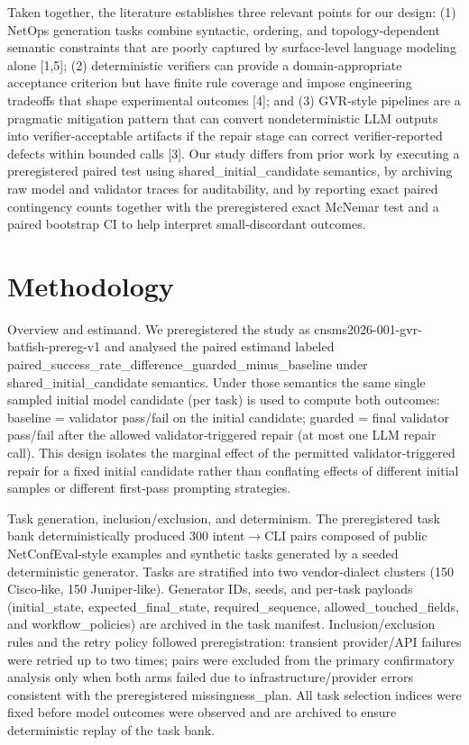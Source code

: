 \documentclass[conference]{IEEEtran}
\begin{document}
Taken together, the literature establishes three relevant points for our design: (1) NetOps generation tasks combine syntactic, ordering, and topology‑dependent semantic constraints that are poorly captured by surface‑level language modeling alone [1,5]; (2) deterministic verifiers can provide a domain‑appropriate acceptance criterion but have finite rule coverage and impose engineering tradeoffs that shape experimental outcomes [4]; and (3) GVR‑style pipelines are a pragmatic mitigation pattern that can convert nondeterministic LLM outputs into verifier‑acceptable artifacts if the repair stage can correct verifier‑reported defects within bounded calls [3]. Our study differs from prior work by executing a preregistered paired test using shared\_initial\_candidate semantics, by archiving raw model and validator traces for auditability, and by reporting exact paired contingency counts together with the preregistered exact McNemar test and a paired bootstrap CI to help interpret small‑discordant outcomes.

\section{Methodology}
Overview and estimand.  We preregistered the study as cnsms2026-001-gvr-batfish-prereg-v1 and analysed the paired estimand labeled paired\_success\_rate\_difference\_guarded\_minus\_baseline under shared\_initial\_candidate semantics. Under those semantics the same single sampled initial model candidate (per task) is used to compute both outcomes: baseline = validator pass/fail on the initial candidate; guarded = final validator pass/fail after the allowed validator‑triggered repair (at most one LLM repair call). This design isolates the marginal effect of the permitted validator‑triggered repair for a fixed initial candidate rather than conflating effects of different initial samples or different first‑pass prompting strategies.

Task generation, inclusion/exclusion, and determinism.  The preregistered task bank deterministically produced 300 intent\ensuremath{\rightarrow}CLI pairs composed of public NetConfEval‑style examples and synthetic tasks generated by a seeded deterministic generator. Tasks are stratified into two vendor‑dialect clusters (150 Cisco‑like, 150 Juniper‑like). Generator IDs, seeds, and per‑task payloads (initial\_state, expected\_final\_state, required\_sequence, allowed\_touched\_fields, and workflow\_policies) are archived in the task manifest. Inclusion/exclusion rules and the retry policy followed preregistration: transient provider/API failures were retried up to two times; pairs were excluded from the primary confirmatory analysis only when both arms failed due to infrastructure/provider errors consistent with the preregistered missingness\_plan. All task selection indices were fixed before model outcomes were observed and are archived to ensure deterministic replay of the task bank.
\end{document}
